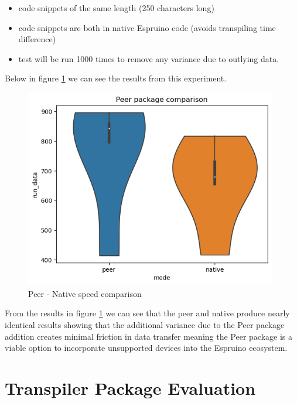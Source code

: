 \documentclass{l4proj}
\begin{document}
\begin{itemize}
    \item code snippets of the same length (250 characters long)
    \item code snippets are both in native Espruino code (avoids transpiling time difference)
    \item test will be run 1000 times to remove any variance due to outlying data.
\end{itemize}

Below in figure \ref{fig:peer-native-speed-comparison} we can see the results from this experiment.


\begin{figure}[H]
    \centering
    \includegraphics[width=11cm]{dissertation/images/peer-native-comparison.png}
    \caption{Peer - Native speed comparison}
    \label{fig:peer-native-speed-comparison}
\end{figure}

From the results in figure \ref{fig:peer-native-speed-comparison} we can see that the peer and native produce nearly identical results showing that the additional variance due to the Peer package addition creates minimal friction in data transfer meaning the Peer package is a viable option to incorporate unsupported devices into the Espruino ecosystem.

\section{Transpiler Package Evaluation}
\end{document}
